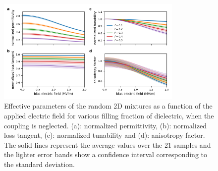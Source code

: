 \documentclass[aps,prb,11pt]{revtex4-1}
\begin{document}
\begin{figure}[h!]
 \centering
 \includegraphics[width=0.8\textwidth]{effpar_rand_uncpl.png}
 \caption{Effective parameters of the random 2D mixtures as a function of the
  applied electric field for various filling fraction of dielectric, when the
  coupling is neglected.
  (a): normalized permittivity, (b): normalized loss tangent, (c): normalized tunability and
  (d): anisotropy factor. The solid lines represent the average values
  over the 21 samples and the lighter error bands show a confidence interval corresponding to
  the standard deviation.}
 \label{eff_par_2Drand_TM_uncpl}
\end{figure}
%







\vskip2pc
\end{document}
